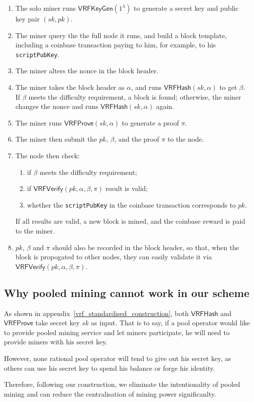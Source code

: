 \begin{enumerate}
    \item The solo miner runs $\mathsf{VRFKeyGen}(1^{\lambda})$ to generate a secret key and public key pair $(sk, pk)$.
    \item The miner query the the full node it runs, and build a block template, including a coinbase transaction paying to him, for example, to his \texttt{scriptPubKey}.
    \item The miner alters the nonce in the block header.
    \item The miner takes the block header as $\alpha$, and runs $\mathsf{VRFHash}(sk, \alpha)$ to get $\beta$. If $\beta$ meets the difficulty requirement, a block is found; otherwise, the miner changes the nonce and runs $\mathsf{VRFHash}(sk, \alpha)$ again.
    \item The miner runs $\mathsf{VRFProve}(sk, \alpha)$ to generate a proof $\pi$.
    \item The miner then submit the $pk$, $\beta$, and the proof $\pi$ to the node.
    \item The node then check:
        \begin{enumerate}
            \item if $\beta$ meets the difficulty requirement;
            \item if $\mathsf{VRFVerify}(pk, \alpha, \beta, \pi)$ result is valid;
            \item whether the \texttt{scriptPubKey} in the coinbase transaction corresponds to $pk$.
        \end{enumerate}
        If all results are valid, a new block is mined, and the coinbase reward is paid to the miner.
    \item $pk$, $\beta$ and $\pi$ should also be recorded in the block header, so that, when the block is propogated to other nodes, they can easily validate it via $\mathsf{VRFVerify}(pk, \alpha, \beta, \pi)$.
\end{enumerate}

\subsection{Why pooled mining cannot work in our scheme}

As shown in appendix~\ref{vrf_standardised_construction}, both $\mathsf{VRFHash}$ and $\mathsf{VRFProve}$ take secret key $sk$ as input.
That is to say, if a pool operator would like to provide pooled mining service and let miners participate, he will need to provide miners with his secret key.

However, none rational pool operator will tend to give out his secret key, as others can use his secret key to spend his balance or forge his identity.

Therefore, following our construction, we eliminate the intentionality of pooled mining and can reduce the centralisation of mining power significanlty.
